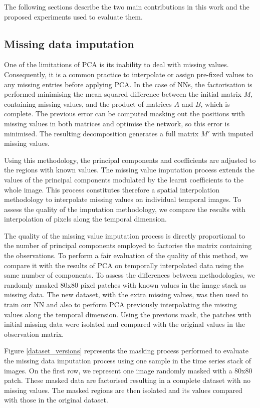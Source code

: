\documentclass[essd, manuscript]{copernicus}
\begin{document}
The following sections describe the two main contributions in this work and the proposed experiments used to evaluate them.

\subsection{Missing data imputation}

One of the limitations of PCA is its inability to deal with missing values. Consequently, it is a common practice to interpolate or assign pre-fixed values to any missing entries before applying PCA. In the case of NNs, the factorisation is performed minimising the mean squared difference between the initial matrix $M$, containing missing values, and the product of matrices $A$ and $B$, which is complete. The previous error can be computed masking out the positions with missing values in both matrices and optimise the network, so this error is minimised. The resulting decomposition generates a full matrix $M'$ with imputed missing values.

Using this methodology, the principal components and coefficients are adjusted to the regions with known values. The missing value imputation process extends the values of the principal components modulated by the learnt coefficients to the whole image. This process constitutes therefore a spatial interpolation methodology to interpolate missing values on individual temporal images. To assess the quality of the imputation methodology, we compare the results with interpolation of pixels along the temporal dimension.

The quality of the missing value imputation process is directly proportional to the number of principal components employed to factorise the matrix containing the observations. To perform a fair evaluation of the quality of this method, we compare it with the results of PCA on temporally interpolated data using the same number of components. To assess the differences between methodologies, we randomly masked 80x80 pixel patches with known values in the image stack as missing data. The new dataset, with the extra missing values, was then used to train our NN and also to perform PCA previously interpolating the missing values along the temporal dimension. Using the previous mask, the patches with initial missing data were isolated and compared with the original values in the observation matrix. 

Figure \ref{dataset_versions} represents the masking process performed to evaluate the missing data imputation process using one sample in the time series stack of images. On the first row, we represent one image randomly masked with a 80x80 patch. These masked data are factorised resulting in a complete dataset with no missing values. The masked regions are then isolated and its values compared with those in the original dataset.
\end{document}

